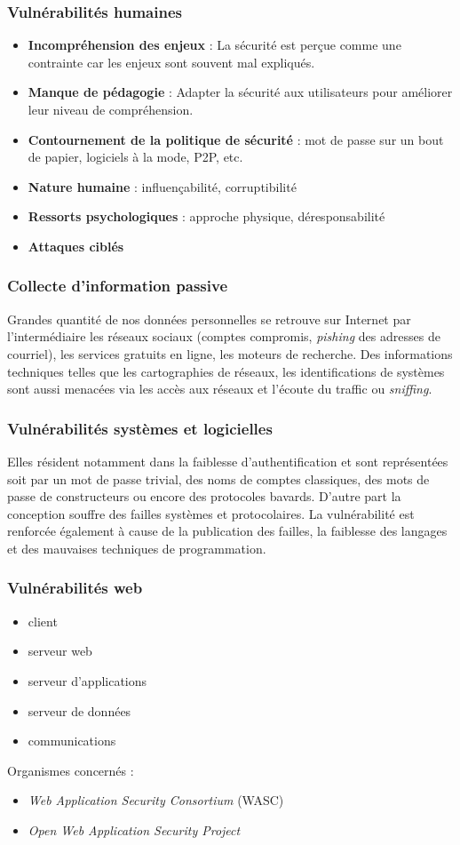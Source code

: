 \documentclass[12pt, a4paper]{article}
\begin{document}
	\subsubsection{Vulnérabilités humaines}
	\begin{itemize}
		\item \textbf{Incompréhension des enjeux} : La sécurité est perçue comme une contrainte car les enjeux sont souvent mal expliqués.
		\item \textbf{Manque de pédagogie} : Adapter la sécurité aux utilisateurs pour améliorer leur niveau de compréhension.
		\item \textbf{Contournement de la politique de sécurité} : mot de passe sur un bout de papier, logiciels à la mode, P2P, etc.
		\item \textbf{Nature humaine} : influençabilité, corruptibilité
		\item \textbf{Ressorts psychologiques} : approche physique, déresponsabilité
		\item \textbf{Attaques ciblés}
	\end{itemize}
	\subsubsection{Collecte d'information passive}
	Grandes quantité de nos données personnelles se retrouve sur Internet par l'intermédiaire les réseaux sociaux (comptes compromis, \textit{pishing} des adresses de courriel), les services gratuits en ligne, les moteurs de recherche. Des informations techniques telles que les cartographies de réseaux, les identifications de systèmes sont aussi menacées via les accès aux réseaux et l'écoute du traffic ou \textit{sniffing}. 
	\subsubsection{Vulnérabilités systèmes et logicielles}
	Elles résident notamment dans la faiblesse d'authentification et sont représentées soit par un mot de passe trivial, des noms de comptes classiques, des mots de passe de constructeurs ou encore des protocoles bavards. D'autre part la conception souffre des failles systèmes et protocolaires. La vulnérabilité est renforcée également à cause de la publication des failles, la faiblesse des langages et des mauvaises techniques de programmation.
	\subsubsection{Vulnérabilités web}
	\begin{itemize}
		\item client
		\item serveur web
		\item serveur d'applications
		\item serveur de données
		\item communications
	\end{itemize}
	Organismes concernés :
	\begin{itemize}
		\item \textit{Web Application Security Consortium} (WASC)
		\item \textit{Open Web Application Security Project}
	\end{itemize}
\end{document}
